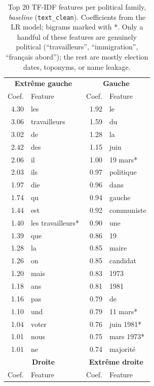\documentclass{article}
\begin{document}
\begin{table}[h]
  \caption{Top 20 TF-IDF features per political family, \emph{baseline} (\texttt{text\_clean}). Coefficients from the LR model; bigrams marked with *. Only a handful of these features are genuinely political (``travailleurs'', ``immigration'', ``français abord''); the rest are mostly election dates, toponyms, or name leakage.}
  \label{tab:top_features}
  \centering
  \small
  \begin{tabular}{rlrl}
    \toprule
    \multicolumn{2}{c}{\textbf{Extr\^{e}me gauche}} & \multicolumn{2}{c}{\textbf{Gauche}} \\
    Coef. & Feature & Coef. & Feature \\
    \midrule
    4.30 & les          & 1.92 & le \\
    3.06 & travailleurs & 1.59 & du \\
    3.02 & de           & 1.28 & la \\
    2.42 & des          & 1.15 & juin \\
    2.06 & il           & 1.00 & 19 mars* \\
    2.03 & ils          & 0.97 & politique \\
    1.97 & die          & 0.96 & dans \\
    1.74 & qu           & 0.94 & gauche \\
    1.44 & est          & 0.92 & communiste \\
    1.40 & les travailleurs* & 0.90 & une \\
    1.39 & que          & 0.86 & 19 \\
    1.28 & la           & 0.85 & maire \\
    1.26 & on           & 0.85 & candidat \\
    1.20 & mais         & 0.83 & 1973 \\
    1.18 & ans          & 0.81 & 1981 \\
    1.16 & pas          & 0.79 & de \\
    1.10 & und          & 0.79 & 11 mars* \\
    1.04 & voter        & 0.76 & juin 1981* \\
    1.01 & nous         & 0.75 & mars 1973* \\
    1.01 & ne           & 0.74 & majorit\'{e} \\
    \midrule
    \multicolumn{2}{c}{\textbf{Droite}} & \multicolumn{2}{c}{\textbf{Extr\^{e}me droite}} \\
    Coef. & Feature & Coef. & Feature \\

\end{tabular}
\end{table}
\end{document}
